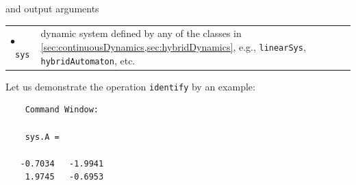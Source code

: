 and output arguments

\begin{center}
\renewcommand{\arraystretch}{1.3}
\begin{tabular}[t]{l p{13cm} }
	$\bullet$~\texttt{sys} & dynamic system defined by any of the classes in \cref{sec:continuousDynamics,sec:hybridDynamics}, e.g., \texttt{linearSys}, \texttt{hybridAutomaton}, etc. \\
\end{tabular}
\end{center}


Let us demonstrate the operation \texttt{identify} by an example:

\begin{center}
\begin{minipage}[t]{0.58\textwidth}
	\footnotesize
	
\end{minipage}
\begin{minipage}[t]{0.4\textwidth}
	\vspace{10pt}

	\begin{verbatim}
	Command Window:	
		
	sys.A =

   -0.7034   -1.9941
    1.9745   -0.6953
	\end{verbatim}
\end{minipage}
\end{center}
